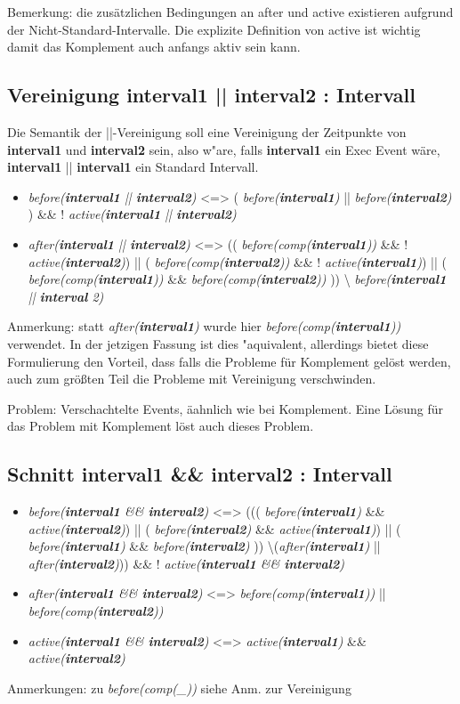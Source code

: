 \documentclass[article,colorback,accentcolor=tud4c]{tudreport}
\newcommand{\before}[1]{\textit{ before(#1) }}
\newcommand{\after}[1]{\textit{after(#1)}}
\newcommand{\aktiv}[1]{\textit{active(#1)}}
\newcommand{\Interval}[1]{\textbf{interval#1}}
\newcommand{\comp}[1]{\textit{comp(#1)}}
\begin{document}
Bemerkung: die zusätzlichen Bedingungen an after und active existieren aufgrund
der Nicht-Standard-Intervalle. Die explizite Definition von active ist wichtig damit das Komplement auch anfangs aktiv sein kann.

\subsection{Vereinigung \Interval{1} || \Interval{2} : Intervall}
Die Semantik der ||-Vereinigung soll eine Vereinigung der Zeitpunkte von \Interval{1}
und \Interval{2} sein, also w"are, falls \Interval{1} ein Exec Event wäre, \Interval{1} || \Interval{1} ein Standard Intervall.
\begin{itemize}
\item \before{\Interval{1} || \Interval{2}}  <=> (\before{\Interval{1}} ||
\before{\Interval{2}}) \&\& !
\aktiv{\Interval{1} || \Interval{2}}
\item \after{\Interval{1} || \Interval{2}} <=> ((\before{comp(\Interval{1})}
\&\& ! \aktiv{\Interval 2}) || (\before{\comp{\Interval{2}}} \&\& !
\aktiv{\Interval{1}}) || (\before{\comp{\Interval{1}}} \&\&
\before{\comp{\Interval{2}}})) \textbackslash \before{\Interval{1} ||
\Interval{} 2}
\end{itemize}
Anmerkung: statt \after{\Interval{1}} wurde hier \before{\comp{\Interval{1}}}
verwendet. In der jetzigen Fassung ist dies "aquivalent, allerdings bietet diese Formulierung den
Vorteil, dass falls die Probleme für Komplement gelöst werden, auch zum größten
Teil die Probleme mit Vereinigung verschwinden.

Problem: Verschachtelte Events, äahnlich wie bei Komplement. Eine Lösung für
das Problem mit Komplement löst auch dieses Problem.

\subsection{Schnitt \Interval{1} \&\& \Interval{2} : Intervall}
\begin{itemize}
\item \before{\Interval{1} \&\& \Interval{2}} <=> (((\before{\Interval{1}} \&\& \aktiv{\Interval{2}}) ||
(\before{\Interval{2}} \&\& \aktiv{\Interval{1}}) || (\before{\Interval{1}} \&\& \before{\Interval{2}}))
\textbackslash (\after{\Interval{1}} || \after{\Interval{2}})) \&\& ! \aktiv{\Interval{1} \&\& \Interval{2}}
\item \after{\Interval{1} \&\& \Interval{2}} <=> \before{\comp{\Interval{1}}} ||
\before{\comp{\Interval{2}}}
\item \aktiv{\Interval{1} \&\& \Interval{2}} <=> \aktiv{\Interval{1}} \&\& \aktiv{\Interval{2}}
\end{itemize}
Anmerkungen: zu \before{\comp{\_}} siehe Anm. zur Vereinigung
\end{document}
